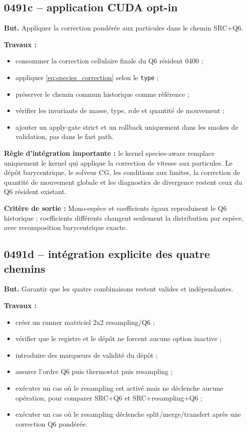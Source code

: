 \documentclass[11pt,a4paper]{article}
\newcommand{\code}[1]{\texttt{#1}}
\newcommand{\criterion}[1]{\colorbox{softgreen}{\parbox{0.93\linewidth}{\textbf{Critère de sortie :} #1}}}
\begin{document}
\subsection{0491c -- application CUDA opt-in}

\textbf{But.} Appliquer la correction pondérée aux particules dans le chemin SRC+Q6.

\textbf{Travaux :}
\begin{itemize}
  \item consommer la correction cellulaire finale du Q6 résident 0400 ;
  \item appliquer \eqref{eq:species_correction} selon le \code{type} ;
  \item préserver le chemin commun historique comme référence ;
  \item vérifier les invariants de masse, type, role et quantité de mouvement ;
  \item ajouter un apply-gate strict et un rollback uniquement dans les smokes de validation, pas dans le fast path.
\end{itemize}

\textbf{Règle d'intégration importante :} le kernel species-aware remplace uniquement le kernel qui applique la correction de vitesse aux particules. Le dépôt barycentrique, le solveur CG, les conditions aux limites, la correction de quantité de mouvement globale et les diagnostics de divergence restent ceux du Q6 résident existant.

\criterion{Mono-espèce et coefficients égaux reproduisent le Q6 historique ; coefficients différents changent seulement la distribution par espèce, avec recomposition barycentrique exacte.}

\subsection{0491d -- intégration explicite des quatre chemins}

\textbf{But.} Garantir que les quatre combinaisons restent valides et indépendantes.

\textbf{Travaux :}
\begin{itemize}
  \item créer un runner matriciel 2x2 resampling/Q6 ;
  \item vérifier que le registre et le dépôt ne forcent aucune option inactive ;
  \item introduire des marqueurs de validité du dépôt ;
  \item assurer l'ordre Q6 puis thermostat puis resampling ;
  \item exécuter un cas où le resampling est activé mais ne déclenche aucune opération, pour comparer SRC+Q6 et SRC+resampling+Q6 ;
  \item exécuter un cas où le resampling déclenche split/merge/transfert après une correction Q6 pondérée.
\end{itemize}
\end{document}
